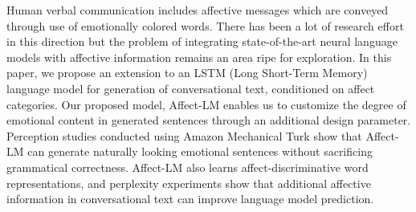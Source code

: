 Human verbal communication includes affective messages which are conveyed through use of emotionally colored words. There has been a lot of research effort in this direction but the problem of integrating state-of-the-art neural language models with affective information remains an area ripe for exploration. In this paper, we propose an extension to an LSTM (Long Short-Term Memory) language model for generation of conversational text, conditioned on affect categories. Our proposed model, Affect-LM enables us to customize the degree of emotional content in generated sentences through an additional design parameter. Perception studies conducted using Amazon Mechanical Turk show that Affect-LM can generate naturally looking emotional sentences without sacrificing grammatical correctness. Affect-LM also learns affect-discriminative word representations, and perplexity experiments show that additional affective information in conversational text can improve language model prediction.
